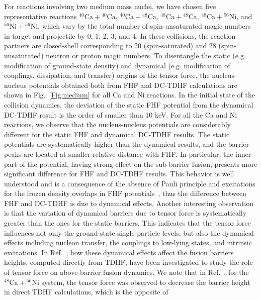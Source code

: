 For reactions involving two medium mass nuclei, we have chosen five representative reactions $^{40}\mathrm{Ca}+\mathrm{^{40}Ca}$,
$^{40}\mathrm{Ca}+\mathrm{^{48}Ca}$, $^{48}\mathrm{Ca}+\mathrm{^{48}Ca}$, $^{48}\mathrm{Ca}+\mathrm{^{56}Ni}$, and $^{56}\mathrm{Ni}+\mathrm{^{56}Ni}$,
which vary by the total number of spin-unsaturated magic numbers in target and projectile by 0, 1, 2, 3, and 4.
In these collisions, the reaction partners are closed-shell corresponding to 20 (spin-saturated) and 28 (spin-unsaturated) neutron or proton magic numbers.
To disentangle the static (e.g. modification of ground-state density) and dynamical (e.g. modification of couplings, dissipation, and transfer) origins of the tensor
force, the nucleus-nucleus potentials obtained both from FHF and DC-TDHF calculations are shown in Fig.~\ref{Fig:medium} for all Ca and Ni reactions.
In the initial state of the collision dynamics, the deviation of the static FHF potential from the dynamical DC-TDHF result is the order of smaller than 10 keV.
For all the Ca and Ni reactions, we observe that the nucleus-nucleus potentials are considerably different for the static FHF and dynamical DC-TDHF results.
The static potentials are systematically higher than the dynamical results, and the barrier peaks are located at smaller relative distance with FHF. In particular,
the inner part of the potential, having strong effect on the sub-barrier fusion, presents more significant difference for FHF and DC-TDHF results.
This behavior is well understood and is a consequence of the absence of Pauli principle and excitations for the frozen density overlaps in FHF
potentials~\citep{Simenel2013_PRC88-064604,Guo2018_PLB782-401,Simenel2017_PRC95-031601}, thus the difference between FHF and DC-TDHF is due to dynamical effects.
Another interesting observation is that the variation of dynamical barriers due to tensor force is systematically greater than the
ones for the static barriers.
This indicates that the tensor force influences not only
the ground-state single-particle levels, but also the dynamical effects including nucleon transfer, the couplings to low-lying states, and intrinsic
excitations.
In Ref.~\citep{Guo2018_PLB782-401}, how these dynamical effects affect the fusion barriers heights, computed directly from TDHF, have been investigated to study the
role of tensor force on above-barrier fusion dynamics.
We note that in Ref.~\citep{Guo2018_PLB782-401}, for the $^{48}\mathrm{Ca}+\mathrm{^{56}Ni}$ system, the
tensor force was observed to decrease the barrier height in direct TDHF calculations, which is the opposite of
